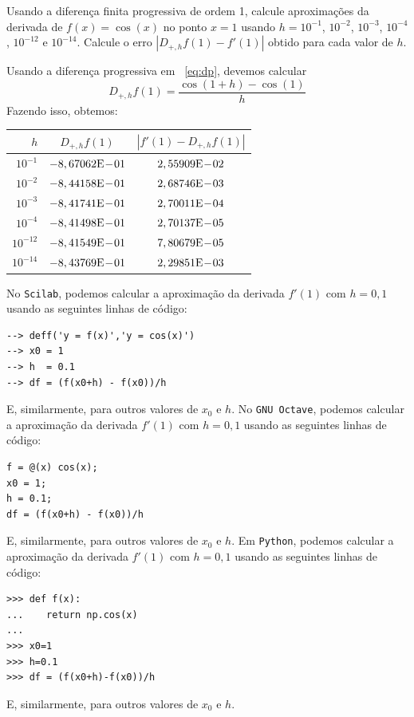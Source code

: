\begin{ex}\label{ex:dp}
Usando a diferença finita progressiva de ordem 1, calcule aproximações da derivada de $f(x)=\cos(x)$ no ponto $x=1$ usando $h=10^{-1}$, $10^{-2}$, $10^{-3}$, $10^{-4}$, $10^{-12}$ e $10^{-14}$. Calcule o erro $|D_{+,h}f(1)-f'(1)|$ obtido para cada valor de $h$.
\end{ex}
\begin{sol}
Usando a diferença progressiva em ~\eqref{eq:dp}, devemos calcular
\begin{equation}
  D_{+,h}f(1) = \frac{\cos(1 + h) - \cos(1)}{h}
\end{equation}
Fazendo isso, obtemos:
\begin{center}
  \begin{tabular}{r|c|c}
    $h$        & $D_{+,h}f(1)$   & $|f'(1) - D_{+,h}f(1)|$ \\ \hline
    $10^{-1}$  & $-8,67062\mathrm{E}\!-\!01$ & $2,55909\mathrm{E}\!-\!02$\\
    $10^{-2}$  & $-8,44158\mathrm{E}\!-\!01$ & $2,68746\mathrm{E}\!-\!03$\\
    $10^{-3}$  & $-8,41741\mathrm{E}\!-\!01$ & $2,70011\mathrm{E}\!-\!04$\\
    $10^{-4}$  & $-8,41498\mathrm{E}\!-\!01$ & $2,70137\mathrm{E}\!-\!05$ \\
    $10^{-12}$ & $-8,41549\mathrm{E}\!-\!01$ & $7,80679\mathrm{E}\!-\!05$\\
    $10^{-14}$ & $-8,43769\mathrm{E}\!-\!01$ & $2,29851\mathrm{E}\!-\!03$ \\\hline
  \end{tabular}
\end{center}

\ifisscilab
No \verb+Scilab+, podemos calcular a aproximação da derivada $f'(1)$ com $h=0,1$ usando as seguintes linhas de código:
\begin{verbatim}
--> deff('y = f(x)','y = cos(x)')
--> x0 = 1
--> h  = 0.1
--> df = (f(x0+h) - f(x0))/h
\end{verbatim}
E, similarmente, para outros valores de $x_0$ e $h$.
\fi
\ifisoctave
No \verb+GNU Octave+, podemos calcular a aproximação da derivada $f'(1)$ com $h=0,1$ usando as seguintes linhas de código:
\begin{verbatim}
f = @(x) cos(x);
x0 = 1;
h = 0.1;
df = (f(x0+h) - f(x0))/h
\end{verbatim}
E, similarmente, para outros valores de $x_0$ e $h$.
\fi
\ifispython
Em \verb+Python+, podemos calcular a aproximação da derivada $f'(1)$ com $h=0,1$ usando as seguintes linhas de código:
\begin{verbatim}
>>> def f(x):
...    return np.cos(x)
...
>>> x0=1
>>> h=0.1
>>> df = (f(x0+h)-f(x0))/h
\end{verbatim}
E, similarmente, para outros valores de $x_0$ e $h$.
\fi
\end{sol}

